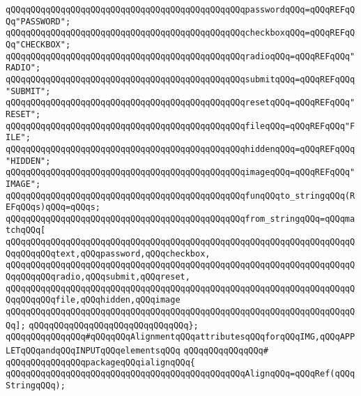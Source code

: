 \verb|qQQqqQQqqQQqqQQqqQQqqQQqqQQqqQQqqQQqqQQqqQQqqQQqpasswordqQQq=qQQqREFqQQq"PASSWORD";|\newline
\verb|qQQqqQQqqQQqqQQqqQQqqQQqqQQqqQQqqQQqqQQqqQQqqQQqcheckboxqQQq=qQQqREFqQQq"CHECKBOX";|\newline
\verb|qQQqqQQqqQQqqQQqqQQqqQQqqQQqqQQqqQQqqQQqqQQqqQQqradioqQQq=qQQqREFqQQq"RADIO";|\newline
\verb|qQQqqQQqqQQqqQQqqQQqqQQqqQQqqQQqqQQqqQQqqQQqqQQqsubmitqQQq=qQQqREFqQQq"SUBMIT";|\newline
\verb|qQQqqQQqqQQqqQQqqQQqqQQqqQQqqQQqqQQqqQQqqQQqqQQqresetqQQq=qQQqREFqQQq"RESET";|\newline
\verb|qQQqqQQqqQQqqQQqqQQqqQQqqQQqqQQqqQQqqQQqqQQqqQQqfileqQQq=qQQqREFqQQq"FILE";|\newline
\verb|qQQqqQQqqQQqqQQqqQQqqQQqqQQqqQQqqQQqqQQqqQQqqQQqhiddenqQQq=qQQqREFqQQq"HIDDEN";|\newline
\verb|qQQqqQQqqQQqqQQqqQQqqQQqqQQqqQQqqQQqqQQqqQQqqQQqimageqQQq=qQQqREFqQQq"IMAGE";|\newline
\verb|qQQqqQQqqQQqqQQqqQQqqQQqqQQqqQQqqQQqqQQqqQQqqQQqfunqQQqto_stringqQQq(REFqQQqs)qQQq=qQQqs;|\newline
\verb|qQQqqQQqqQQqqQQqqQQqqQQqqQQqqQQqqQQqqQQqqQQqqQQqfrom_stringqQQq=qQQqmatchqQQq[|\newline
\verb|qQQqqQQqqQQqqQQqqQQqqQQqqQQqqQQqqQQqqQQqqQQqqQQqqQQqqQQqqQQqqQQqqQQqqQQqqQQqqQQqtext,qQQqpassword,qQQqcheckbox,|\newline
\verb|qQQqqQQqqQQqqQQqqQQqqQQqqQQqqQQqqQQqqQQqqQQqqQQqqQQqqQQqqQQqqQQqqQQqqQQqqQQqqQQqradio,qQQqsubmit,qQQqreset,|\newline
\verb|qQQqqQQqqQQqqQQqqQQqqQQqqQQqqQQqqQQqqQQqqQQqqQQqqQQqqQQqqQQqqQQqqQQqqQQqqQQqqQQqfile,qQQqhidden,qQQqimage|\newline
\verb|qQQqqQQqqQQqqQQqqQQqqQQqqQQqqQQqqQQqqQQqqQQqqQQqqQQqqQQqqQQqqQQqqQQqqQQq];|\newline
\verb|qQQqqQQqqQQqqQQqqQQqqQQqqQQqqQQq};|\newline
\newline
\verb|qQQqqQQqqQQqqQQq#qQQqqQQqAlignmentqQQqattributesqQQqforqQQqIMG,qQQqAPPLETqQQqandqQQqINPUTqQQqelementsqQQq|\newline
\verb|qQQqqQQqqQQqqQQq#|\newline
\verb|qQQqqQQqqQQqqQQqpackageqQQqialignqQQq{|\newline
\newline
\verb|qQQqqQQqqQQqqQQqqQQqqQQqqQQqqQQqqQQqqQQqqQQqqQQqAlignqQQq=qQQqRef(qQQqStringqQQq);|\newline

